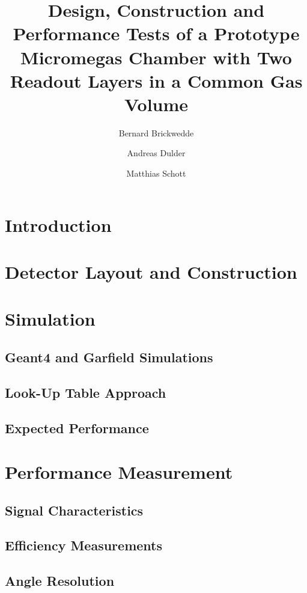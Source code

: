 \documentclass[a4paper,11pt]{article}
\title{\boldmath Design, Construction and Performance Tests of a Prototype Micromegas Chamber with Two Readout Layers in a Common Gas Volume}
\author[a]{Bernard Brickwedde}
\author[a]{Andreas Dulder}
\author[a]{Matthias Schott}
\affiliation[a]{Johannes Gutenberg-University, Mainz, Germany}
\begin{document}
\maketitle
\flushbottom
\newpage

\section{\label{Sec:Intro}Introduction}



\section{\label{Sec:Detector}Detector Layout and Construction}


\section{\label{Sec:Simulation}Simulation}

\subsection{Geant4 and Garfield Simulations}

\subsection{Look-Up Table Approach}

\subsection{Expected Performance}



\section{\label{Sec:Efficiency}Performance Measurement}

\subsection{Signal Characteristics}

\subsection{Efficiency Measurements}

\subsection{Angle Resolution}
\end{document}
